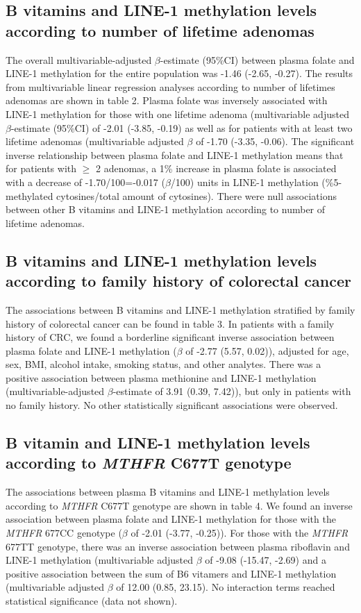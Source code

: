 \subsection{B vitamins and LINE-1 methylation levels according to number of lifetime adenomas} %
\noindent The overall multivariable-adjusted $\beta$-estimate (95\%CI) between plasma folate and LINE-1 methylation for the entire population was -1.46 (-2.65, -0.27). The results from multivariable linear regression analyses according to number of lifetimes adenomas are shown in table 2. Plasma folate was inversely associated with LINE-1 methylation for those with one lifetime adenoma (multivariable adjusted $\beta$-estimate (95\%CI) of -2.01 (-3.85, -0.19) as well as for patients with at least two lifetime adenomas (multivariable adjusted $\beta$ of -1.70 (-3.35, -0.06). The significant inverse relationship between plasma folate and LINE-1 methylation means that for patients with $\geq$ 2 adenomas, a 1\% increase in plasma folate is associated with a decrease of -1.70/100=-0.017 ($\beta$/100) units in LINE-1 methylation (\%5-methylated cytosines/total amount of cytosines). There were null associations between other B vitamins and LINE-1 methylation according to number of lifetime adenomas.

\subsection{B vitamins and LINE-1 methylation levels according to family history of colorectal cancer} %
\noindent The associations between B vitamins and LINE-1 methylation stratified by family history of colorectal cancer can be found in table 3. In patients with a family history of CRC, we found a borderline significant inverse association between plasma folate and LINE-1 methylation ($\beta$ of -2.77 (5.57, 0.02)), adjusted for age, sex, BMI, alcohol intake, smoking status, and other analytes. There was a positive association between plasma methionine and LINE-1 methylation (multivariable-adjusted $\beta$-estimate of 3.91 (0.39, 7.42)), but only in patients with no family history. No other statistically significant associations were observed.

\subsection{B vitamin and LINE-1 methylation levels according to \emph{MTHFR} C677T genotype} %
\noindent The associations between plasma B vitamins and LINE-1 methylation levels according to \emph{MTHFR} C677T genotype are shown in table 4. We found an inverse association between plasma folate and LINE-1 methylation for those with the \emph{MTHFR} 677CC genotype ($\beta$ of -2.01 (-3.77, -0.25)). For those with the \emph{MTHFR} 677TT genotype, there was an inverse association between plasma riboflavin and LINE-1 methylation (multivariable adjusted $\beta$ of -9.08 (-15.47, -2.69) and a positive association between the sum of B6 vitamers and LINE-1 methylation (multivariable adjusted $\beta$ of 12.00 (0.85, 23.15). No interaction terms reached statistical significance (data not shown).

